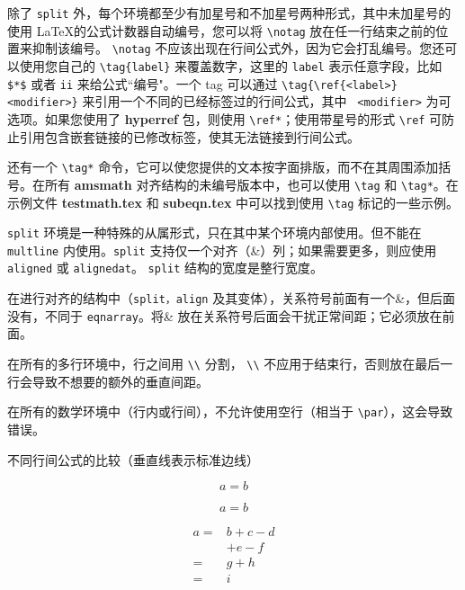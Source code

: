 \documentclass[openany]{ctexbook}
\begin{document}
除了 \verb|split| 外，每个环境都至少有加星号和不加星号两种形式，其中未加星号的使用 \LaTeX 的公式计数器自动编号，您可以将 \verb|\notag| 放在任一行结束之前的位置来抑制该编号。 \verb|\notag| 不应该出现在行间公式外，因为它会打乱编号。您还可以使用您自己的 \verb|\tag{label}| 来覆盖数字，这里的 \verb|label| 表示任意字段，比如 \verb|$*$| 或者 \verb|ii| 来给公式``编号"。一个 tag 可以通过 \verb|\tag{\ref{<label>}<modifier>}| 来引用一个不同的已经标签过的行间公式，其中 \verb| <modifier>| 为可选项。如果您使用了 {\bfseries hyperref} 包，则使用 \verb|\ref*|；使用带星号的形式 \verb|\ref| 可防止引用包含嵌套链接的已修改标签，使其无法链接到行间公式。

还有一个 \verb|\tag*| 命令，它可以使您提供的文本按字面排版，而不在其周围添加括号。在所有 {\bfseries amsmath} 对齐结构的未编号版本中，也可以使用 \verb|\tag| 和 \verb|\tag*|。在示例文件 {\bfseries testmath.tex} 和 {\bfseries subeqn.tex} 中可以找到使用 \verb|\tag| 标记的一些示例。

\verb|split| 环境是一种特殊的从属形式，只在其中某个环境内部使用。但不能在 \verb|multline| 内使用。\verb|split| 支持仅一个对齐（\&）列；如果需要更多，则应使用 \verb|aligned| 或 \verb|alignedat|。 \verb|split| 结构的宽度是整行宽度。

在进行对齐的结构中（\verb|split，align| 及其变体），关系符号前面有一个\&，但后面没有，不同于 \verb|eqnarray|。将\& 放在关系符号后面会干扰正常间距；它必须放在前面。

在所有的多行环境中，行之间用 \verb|\\| 分割， \verb|\\| 不应用于结束行，否则放在最后一行会导致不想要的额外的垂直间距。

在所有的数学环境中（行内或行间），不允许使用空行（相当于 \verb|\par|），这会导致错误。

不同行间公式的比较（垂直线表示标准边线）

\begin{listing}
\begin{equation*}
a=b
\end{equation*}
\end{listing}




\begin{listing}
\begin{equation}
a=b
\end{equation}
\end{listing}



\begin{listing}
\begin{equation}\label{xx}
\begin{split}
a={}&b+c-d\\
&+e-f\\
={}&g+h\\
={}&i
\end{split}
\end{equation}
\end{listing}
\end{document}

